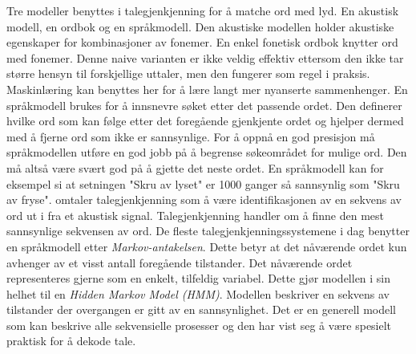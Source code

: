Tre modeller benyttes i talegjenkjenning for å matche ord med lyd. En akustisk modell, en ordbok og en språkmodell. Den akustiske modellen holder akustiske egenskaper for kombinasjoner av fonemer. En enkel fonetisk ordbok knytter ord med fonemer. Denne naive varianten er ikke veldig effektiv ettersom den ikke tar større hensyn til forskjellige uttaler, men den fungerer som regel i praksis. Maskinlæring kan benyttes her for å lære langt mer nyanserte sammenhenger. En språkmodell brukes for å innsnevre søket etter det passende ordet. Den definerer hvilke ord som kan følge etter det foregående gjenkjente ordet og hjelper dermed med å fjerne ord som ikke er sannsynlige. For å oppnå en god presisjon må språkmodellen utføre en god jobb på å begrense søkeområdet for mulige ord. Den må altså være svært god på å gjette det neste ordet. En språkmodell kan for eksempel si at setningen "Skru av lyset" er 1000 ganger så sannsynlig som "Skru av fryse". \citet{russellnorvig10} omtaler talegjenkjenning som å være identifikasjonen av en sekvens av ord ut i fra et akustisk signal. Talegjenkjenning handler om å finne den mest sannsynlige sekvensen av ord. De fleste talegjenkjenningssystemene i dag benytter en språkmodell etter \emph{Markov-antakelsen}. Dette betyr at det nåværende ordet kun avhenger av et visst antall foregående tilstander. Det nåværende ordet representeres gjerne som en enkelt, tilfeldig variabel. Dette gjør modellen i sin helhet til en \emph{Hidden Markov Model (HMM)}. Modellen beskriver en sekvens av tilstander der overgangen er gitt av en sannsynlighet. Det er en generell modell som kan beskrive alle sekvensielle prosesser og den har vist seg å være spesielt praktisk for å dekode tale. 
